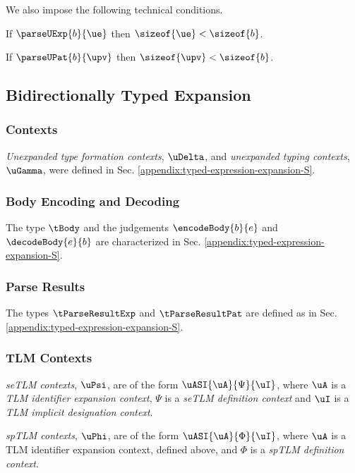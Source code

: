 We also impose the following technical conditions.

\begin{condition}\label{condition:body-parsing-BS} If $\parseUExp{b}{\ue}$ then $\sizeof{\ue} < \sizeof{b}$.\end{condition}

\begin{condition}\label{condition:pattern-parsing-BS} If $\parseUPat{b}{\upv}$ then $\sizeof{\upv} < \sizeof{b}$.\end{condition}

\subsection{Bidirectionally Typed Expansion}
\subsubsection{Contexts}
\emph{Unexpanded type formation contexts}, $\uDelta$, and \emph{unexpanded typing contexts}, $\uGamma$, were defined in Sec. \ref{appendix:typed-expression-expansion-S}.

\subsubsection{Body Encoding and Decoding}
The type $\tBody$ and the judgements $\encodeBody{b}{e}$ and $\decodeBody{e}{b}$ are characterized in Sec. \ref{appendix:typed-expression-expansion-S}.

\subsubsection{Parse Results}
The types $\tParseResultExp$ and $\tParseResultPat$ are defined as in Sec. \ref{appendix:typed-expression-expansion-S}.

\subsubsection{TLM Contexts}

\emph{seTLM contexts}, $\uPsi$, are of the form $\uASI{\uA}{\Psi}{\uI}$, where $\uA$ is a \emph{TLM identifier expansion context}, $\Psi$ is a \emph{seTLM definition context} and $\uI$ is a \emph{TLM implicit designation context}.

\emph{spTLM contexts}, $\uPhi$, are of the form $\uASI{\uA}{\Phi}{\uI}$, where $\uA$ is a {TLM identifier expansion context}, defined above, and $\Phi$ is a \emph{spTLM definition context}. 

